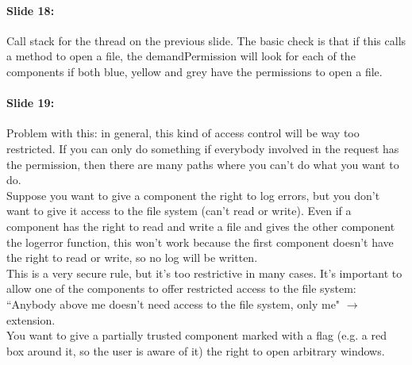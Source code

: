 \documentclass[10pt,a4paper]{report}
\begin{document}
\paragraph{Slide 18:} Call stack for the thread on the previous slide. The basic check is that if this calls a method to open a file, the demandPermission will look for each of the components if both blue, yellow and grey have the permissions to open a file. 

\paragraph{Slide 19:} Problem with this: in general, this kind of access control will be way too restricted. If you can only do something if everybody involved in the request has the permission, then there are many paths where you can't do what you want to do.\\
Suppose you want to give a component the right to log errors, but you don't want to give it access to the file system (can't read or write). Even if a component has the right to read and write a file and gives the other component the logerror function, this won't work because the first component doesn't have the right to read or write, so no log will be written.\\
This is a very secure rule, but it's too restrictive in many cases. It's important to allow one of the components to offer restricted access to the file system: ``Anybody above me doesn't need access to the file system, only me" $\rightarrow$ extension.\\
You want to give a partially trusted component marked with a flag (e.g. a red box around it, so the user is aware of it) the right to open arbitrary windows.
\end{document}
